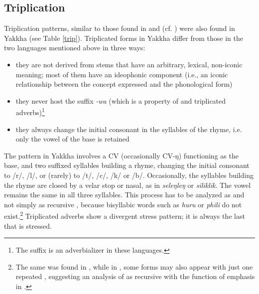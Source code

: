 \subsection{Triplication}\label{sec-trip}

Triplication patterns, similar to those found in  and  (cf. \citet{Rai1984A-descriptive, Raietal1997Triplicated, Raietal2005Triplication}) were also found in Yakkha (see Table \ref{trip}). Triplicated forms in Yakkha differ from those in the two  languages mentioned above in three ways: 

\begin{itemize}
\item  they are not derived from stems that have an arbitrary, lexical, non-iconic meaning; most of them have an ideophonic component (i.e., an iconic relationship between the concept expressed and the phonological form)
\item  they never host the suffix \emph{-wa} (which is a property of  and  triplicated adverbs)\footnote{The suffix is an adverbializer in these languages.}
\item they always change the initial consonant in the syllables of the rhyme, i.e. only the vowel of the base is retained
\end{itemize}


The  pattern in Yakkha involves a  CV (occasionally CV-ŋ) functioning as the base, and two suffixed syllables building a rhyme, changing the initial consonant to /r/, /l/, or (rarely) to /t/, /c/, /k/ or /b/. Occasionally, the syllables building the rhyme are closed by a velar stop or nasal, as in \emph{seleŋleŋ} or \emph{siliklik}. The vowel remains the same in all three syllables. This process has to be analyzed as  and not simply as recursive , because bisyllabic words such as \emph{huru} or \emph{phili} do not exist.\footnote{The same was found in  \citep{Raietal2005Triplication}, while in  , some forms may also appear with just one repeated , suggesting an analysis of  as recursive  with the function of emphasis in  \citep[304]{Doornenbal2009A-grammar}.} Triplicated adverbs show a divergent stress pattern; it is always the last  that is stressed.


